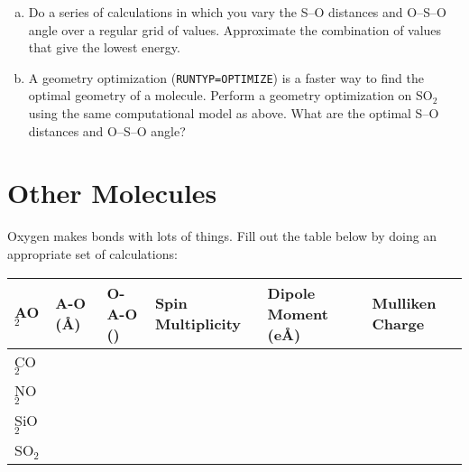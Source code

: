 \documentclass[11pt]{article}
\begin{document}
\begin{enumerate}[(a)]
\item Do a series of calculations in which you vary the S–O distances and O–S–O angle over a regular grid of values. Approximate the combination of values that give the lowest energy.

\item A geometry optimization (\verb~RUNTYP=OPTIMIZE~) is a faster way to find the optimal geometry of a molecule. Perform a geometry optimization on SO$_{\text{2}}$ using the same computational model as above. What are the optimal S–O distances and O–S–O angle?
\end{enumerate}

\section{Other Molecules}
\label{sec-4}

Oxygen makes bonds with lots of things. Fill out the table below by doing an appropriate set of calculations:

\begin{center}
\begin{tabular}{llllll}
AO$_{\text{2}}$ & A-O (\AA{}) & O-A-O (\textdegree{}) & Spin Multiplicity & Dipole Moment (e\AA{}) & Mulliken Charge\\
\hline
CO$_{\text{2}}$ &  &  &  &  & \\
NO$_{\text{2}}$ &  &  &  &  & \\
SiO$_{\text{2}}$ &  &  &  &  & \\
SO$_{\text{2}}$ &  &  &  &  & \\
\end{tabular}
\end{center}
\end{document}
